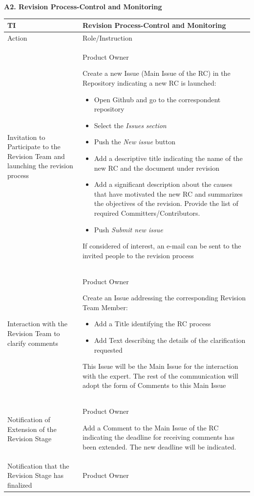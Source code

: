 \documentclass{template/openetcs_article}
\begin{document}
\textbf{A2. Revision Process-Control and Monitoring}
\begin{table}[H]
\begin{tabular}{|m{3cm}|m{11cm}|}
\hline
\rowcolor{myblue}
TI & 
Revision Process-Control and Monitoring
\\\hline
\rowcolor{lightgray}
Action &
Role/Instruction
\\\hline
Invitation to Participate to the Revision Team and launching the revision process &
Product Owner

Create a new Issue (Main Issue of the RC) in the Repository indicating a new RC is launched:
\begin{itemize}
\item Open Github and go to the correspondent repository
\item Select the {\it Issues section}
\item Push the {\it New issue} button
\item Add a descriptive title indicating the name of the new RC and the document under revision
\item Add a significant description about the causes that have motivated the new RC and summarizes the objectives of the revision. Provide the list of required Committers/Contributors.
\item Push {\it Submit new issue} 
\end{itemize}
If considered of interest, an e-mail can be sent to the invited people to the revision process
\\\hline
Interaction with the Revision Team to clarify comments &
Product Owner

Create an Issue addressing the corresponding Revision Team Member:
\begin{itemize}
\item Add a Title identifying the RC process
\item Add Text describing the details of the clarification requested
\end{itemize}
This Issue will be the Main Issue for the interaction with the expert. The rest of the communication will adopt the form of Comments to this Main Issue
\\\hline
Notification of Extension of the Revision Stage &
Product Owner

Add a Comment to the Main Issue of the RC indicating the deadline for receiving comments has been extended. The new deadline will be indicated.
\\\hline
Notification that the Revision Stage has finalized &
Product Owner


\end{tabular}
\end{table}
\end{document}
